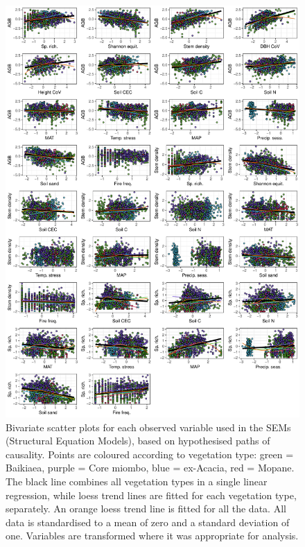 \begin{refsection}
\begin{supplement}
\begin{figure}[H]
	\includegraphics[width=0.9\linewidth]{img/bivar_lm}
	\caption[Bivariate scatter plots of observed variables]{Bivariate scatter plots for each observed variable used in the SEMs (Structural Equation Models), based on hypothesised paths of causality. Points are coloured according to vegetation type: green = Baikiaea, purple = Core miombo, blue = ex-Acacia, red = Mopane. The black line combines all vegetation types in a single linear regression, while loess trend lines are fitted for each vegetation type, separately. An orange loess trend line is fitted for all the data. All data is standardised to a mean of zero and a standard deviation of one. Variables are transformed where it was appropriate for analysis.}
	\label{befr:bivar_lm}
\end{figure}


\end{supplement}
\end{refsection}
